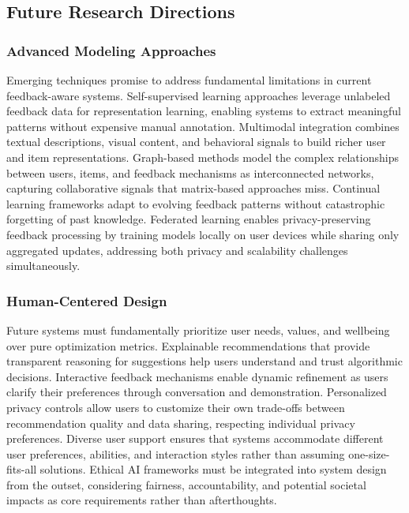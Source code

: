 \subsection{Future Research Directions}

\subsubsection{Advanced Modeling Approaches}

Emerging techniques promise to address fundamental limitations in current feedback-aware systems. Self-supervised learning approaches leverage unlabeled feedback data for representation learning, enabling systems to extract meaningful patterns without expensive manual annotation. Multimodal integration combines textual descriptions, visual content, and behavioral signals to build richer user and item representations. Graph-based methods model the complex relationships between users, items, and feedback mechanisms as interconnected networks, capturing collaborative signals that matrix-based approaches miss. Continual learning frameworks adapt to evolving feedback patterns without catastrophic forgetting of past knowledge. Federated learning enables privacy-preserving feedback processing by training models locally on user devices while sharing only aggregated updates, addressing both privacy and scalability challenges simultaneously.

\subsubsection{Human-Centered Design}

Future systems must fundamentally prioritize user needs, values, and wellbeing over pure optimization metrics. Explainable recommendations that provide transparent reasoning for suggestions help users understand and trust algorithmic decisions. Interactive feedback mechanisms enable dynamic refinement as users clarify their preferences through conversation and demonstration. Personalized privacy controls allow users to customize their own trade-offs between recommendation quality and data sharing, respecting individual privacy preferences. Diverse user support ensures that systems accommodate different user preferences, abilities, and interaction styles rather than assuming one-size-fits-all solutions. Ethical AI frameworks must be integrated into system design from the outset, considering fairness, accountability, and potential societal impacts as core requirements rather than afterthoughts.

